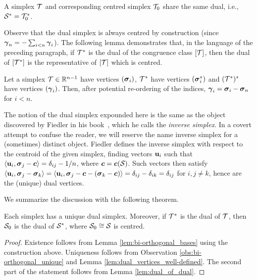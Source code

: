 \begin{observation}
	\label{obs:dual_centred}
	A simplex $\mathcal{T}$ and corresponding centred simplex $\mathcal{T}_0$ share the same dual, i.e., $\mathcal{S}^* = \mathcal{T}_0^*$. 
\end{observation}


Observe that the dual simplex is always centred by construction (since $\vb*{\gamma}_n=-\sum_{i<n}\vb*{\gamma}_i$).  The following lemma demonstrates that, in the language of the preceding paragraph, if $\mathcal{T}^*$ is the dual of the congruence class $[\mathcal{T}]$, then the dual of $[\mathcal{T}^*]$ is the representative of $[\mathcal{T}]$ which is centred. 

\begin{lemma}
	\label{lem:dual_of_dual}
	Let a simplex $\mathcal{T}\in\mathbb{R}^{n-1}$ have vertices $(\vb*{\sigma}_i)$, $\mathcal{T}^*$ have vertices $(\vb*{\sigma}_i^*)$ and $(\mathcal{T}^*)^*$ have vertices $(\vb*{\gamma}_i)$. Then, after potential re-ordering of the indices, $\vb*{\gamma}_i = \vb*{\sigma}_i-\vb*{\sigma}_n$ for $i<n$. 
\end{lemma}

\begin{remark}
	The notion of the dual simplex expounded here is the same as the object discovered by Fiedler in his book~\cite[Chapter 5]{fiedler2011matrices}, which he calls the \emph{inverse simplex}. In a covert attempt to confuse the reader, we will reserve the name inverse simplex for a (sometimes) distinct object. Fiedler defines the inverse simplex with respect to the centroid of the given simplex, finding vectors $\vb{u}_i$ such that $\langle \vb{u}_i,\vb*{\sigma}_j-\vb*{c}\rangle = \delta_{ij}-1/n$, where $\vb*{c}=\vb*{c}(\mathcal{S})$.  Such vectors then satisfy $\langle \vb{u}_i,\vb*{\sigma}_j-\vb*{\sigma}_k\rangle = \langle \vb{u}_i,\vb*{\sigma}_j-\vb*{c}-(\vb*{\sigma}_k-\vb*{c})\rangle = \delta_{ij}-\delta_{ik}=\delta_{ij}$ for $i,j\neq k$, hence are the (unique) dual vertices. 
\end{remark}

We summarize the discussion with the following theorem. 

\begin{theorem}
	\label{thm:dual_simplex}
Each simplex has a unique dual simplex. Moreover, if $\mathcal{T}^*$ is the dual of $\mathcal{T}$, then $\mathcal{S}_0$ is the dual of $\mathcal{S}^*$, where $\mathcal{S}_0\cong \mathcal{S}$ is centred. 
  \end{theorem}
\begin{proof}
Existence follows from Lemma \ref{lem:bi-orthogonal_bases} using the construction above. Uniqueness follows from Observation \ref{obs:bi-orthogonal_unique} and Lemma \ref{lem:dual_vertices_well-defined}. The second part of the statement follows from Lemma \ref{lem:dual_of_dual}. 
\end{proof}

